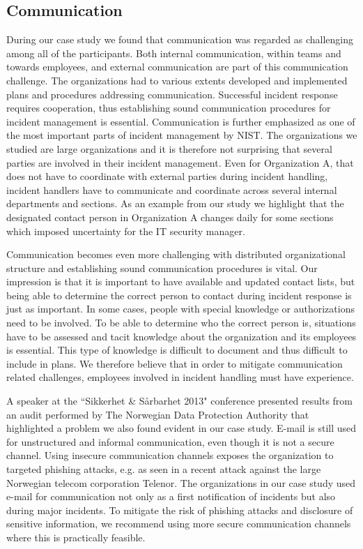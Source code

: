 \subsection{Communication}
During our case study we found that communication was regarded as challenging among all of the participants. Both internal communication, within teams and towards employees, and external communication are part of this communication challenge. The organizations had to various extents developed and implemented plans and procedures addressing communication. Successful incident response requires cooperation, thus establishing sound communication procedures for incident management is essential. Communication is further emphasized as one of the most important parts of incident management by NIST. The organizations we studied are large organizations and it is therefore not surprising that several parties are involved in their incident management. Even for Organization A, that does not have to coordinate with external parties during incident handling, incident handlers have to communicate and coordinate across several internal departments and sections. As an example from our study we highlight that the designated contact person in Organization A changes daily for some sections which imposed uncertainty for the IT security manager. 

Communication becomes even more challenging with distributed organizational structure and establishing sound communication procedures is vital. Our impression is that it is important to have available and updated contact lists, but being able to determine the correct person to contact during incident response is just as important. In some cases, people with special knowledge or authorizations need to be involved. To be able to determine who the correct person is, situations have to be assessed and tacit knowledge about the organization and its employees is essential. This type of knowledge is difficult to document and thus difficult to include in plans. We therefore believe that in order to mitigate communication related challenges, employees involved in incident handling must have experience. 

A speaker at the ``Sikkerhet \& S\aa rbarhet 2013" conference presented results from an audit performed by The Norwegian Data Protection Authority that highlighted a problem we also found evident in our case study. E-mail is still used for unstructured and informal communication, even though it is not a secure channel. Using insecure communication channels exposes the organization to targeted phishing attacks, e.g. as seen in a recent attack against the large Norwegian telecom corporation Telenor\cite{phisingattack}. The organizations in our case study used e-mail for communication not only as a first notification of incidents but also during major incidents. To mitigate the risk of phishing attacks and disclosure of sensitive information, we recommend using more secure communication channels where this is practically feasible. 


